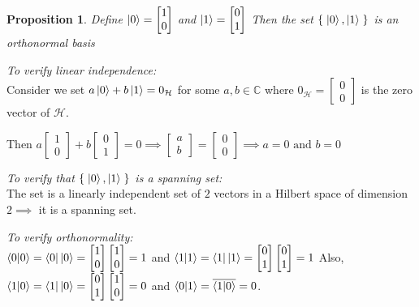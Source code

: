 \documentclass[12pt,twoside,fleqn]{report}
\makeatletter
\theoremstyle{thmstyle}
\renewenvironment{proof}[1][\proofname]{\par
\pushQED{\qed}%
\normalfont \topsep6\p@\@plus6\p@\relax
\trivlist
\item[\hskip\labelsep\itshape#1\@addpunct{.}]\mbox{}\par\nobreak\ignorespaces
}{%
    \popQED\endtrivlist\@endpefalse
    }
\newtheorem{prop}{Proposition}[chapter]
\makeatother
\begin{document}
\begin{prop}
    Define $\ket{0} = \begin{bmatrix} 1 \\ 0 \end{bmatrix}$ and $\ket{1} = \begin{bmatrix} 0 \\ 1 \end{bmatrix}$
        Then the set $\{ \; \ket{0}, \ket{1} \; \}$ is an orthonormal basis
\end{prop}
\begin{proof} 
    \emph{To verify linear independence:} \\
    Consider we set $a \ket{0} + b \ket{1} = 0_\mathcal{H}$ for some $a, b \in \mathbb{C}$ where $0_\mathcal{H} = \begin{bmatrix} 0 \\ 0 \end{bmatrix}$ is the zero vector of $\mathcal{H}$.

        Then $a \begin{bmatrix} 1 \\ 0 \end{bmatrix} + b \begin{bmatrix} 0 \\ 1 \end{bmatrix} = 0 \implies \begin{bmatrix} a \\ b \end{bmatrix} = \begin{bmatrix} 0 \\ 0 \end{bmatrix} \implies a = 0 \text{ and } b = 0$ 


    \emph{To verify that $\{ \; \ket{0}, \ket{1} \; \}$ is a spanning set:} \\
    The set is a linearly independent set of $2$ vectors in a Hilbert space of dimension $2 \implies$  it is a spanning set.

    \emph{To verify orthonormality:} \\
    $\braket{0|0} = \bra{0}\ket{0} = \begin{bmatrix} 1 \\ 0 \end{bmatrix} \begin{bmatrix} 1 \\ 0 \end{bmatrix} = 1$ and $\braket{1|1} = \bra{1}\ket{1} = \begin{bmatrix} 0 \\ 1 \end{bmatrix} \begin{bmatrix} 0 \\ 1 \end{bmatrix} = 1$
        Also, 
    $\braket{1|0} = \bra{1}\ket{0} = \begin{bmatrix} 0 \\ 1 \end{bmatrix} \begin{bmatrix} 1 \\ 0 \end{bmatrix} = 0$ and $\braket{0|1} = \overline{\braket{1|0}} = 0$.
\end{proof}
\end{document}
